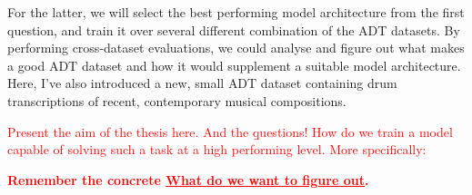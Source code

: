 For the latter, we will select the best performing model architecture from the first question, and train it over several different combination of the \gls{ADT} datasets. By performing cross-dataset evaluations, we could analyse and figure out what makes a good \gls{ADT} dataset and how it would supplement a suitable model architecture. Here, I've also introduced a new, small \gls{ADT} dataset containing drum transcriptions of recent, contemporary musical compositions.

\textcolor{red}{
    Present the aim of the thesis here. And the \b{questions!}
How do we train a model capable of solving such a task at a high performing level. More specifically:
}

\textcolor{red}{\textbf{Remember the concrete \underline{What do we want to figure out}.}}